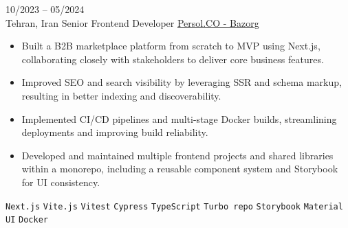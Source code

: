 \entry
{10/2023 -- 05/2024 \\ Tehran, Iran}
{Senior Frontend Developer}
{\href{https://bazorg.com/}{Persol.CO - Bazorg}}
{\vspace{-10pt}
    \begin{itemize}[noitemsep,topsep=0pt,parsep=0pt,partopsep=0pt, leftmargin=-1pt]
        \item Built a B2B marketplace platform from scratch to MVP using Next.js, collaborating closely with stakeholders to deliver core business features.
        \item Improved SEO and search visibility by leveraging SSR and schema markup, resulting in better indexing and discoverability.
        \item Implemented CI/CD pipelines and multi-stage Docker builds, streamlining deployments and improving build reliability.
        \item Developed and maintained multiple frontend projects and shared libraries within a monorepo, including a reusable component system and Storybook for UI consistency.
    \end{itemize}
    \texttt{Next.js} \slashsep \texttt{Vite.js} \slashsep \texttt{Vitest} \slashsep \texttt{Cypress} \slashsep \texttt{TypeScript} \slashsep \texttt{Turbo repo} \slashsep \texttt{Storybook} \slashsep \texttt{Material UI} \slashsep \texttt{Docker}
}
